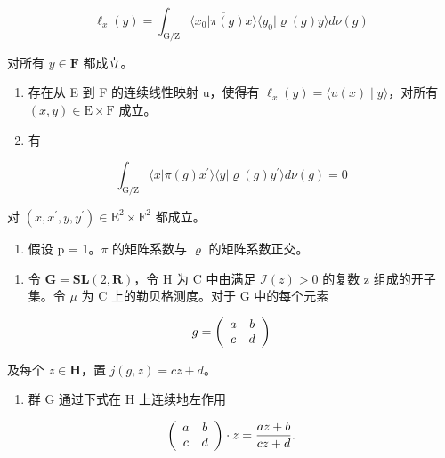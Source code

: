 \[
\ell_ {x} (y) = \int_ {\mathrm{G/Z}} \overline {{\langle x _ {0} | \pi (g) x \rangle}} \langle y _ {0} | \varrho (g) y \rangle d \nu (g)
\]

对所有 \(y \in \mathbf{F}\) 都成立。

\begin{enumerate}
\def\labelenumi{\alph{enumi})}
\setcounter{enumi}{2}
\item
  存在从 E 到 F 的连续线性映射 u，使得有 \(\ell_{x}(y)=\langle u(x)\mid y\rangle\)，对所有 \((x,y)\in\mathrm{E}\times\mathrm{F}\) 成立。
\item
  有
\end{enumerate}

\[
\int_ {\mathrm{G} / \mathrm{Z}} \overline {{\langle x | \pi (g) x ^ {\prime} \rangle}} \langle y | \varrho (g) y ^ {\prime} \rangle d \nu (g) = 0
\]

对 \((x,x^{\prime},y,y^{\prime})\in \mathrm{E}^{2}\times \mathrm{F}^{2}\) 都成立。

\begin{enumerate}
\def\labelenumi{\alph{enumi})}
\setcounter{enumi}{4}
\tightlist
\item
  假设 p = 1。\(\pi\) 的矩阵系数与 \(\varrho\) 的矩阵系数正交。
\end{enumerate}

\begin{enumerate}
\def\labelenumi{\arabic{enumi})}
\setcounter{enumi}{15}
\tightlist
\item
  令 \(\mathbf{G} = \mathbf{S}\mathbf{L}(2, \mathbf{R})\)，令 H 为 C 中由满足 \(\mathcal{I}(z) > 0\) 的复数 z 组成的开子集。令 \(\mu\) 为 C 上的勒贝格测度。对于 G 中的每个元素
\end{enumerate}

\[
g = \left( \begin{array}{c c} a & b \\ c & d \end{array} \right)
\]

及每个 \(z \in \mathbf{H}\)，置 \(j(g, z) = cz + d\)。

\begin{enumerate}
\def\labelenumi{\alph{enumi})}
\tightlist
\item
  群 G 通过下式在 H 上连续地左作用
\end{enumerate}

\[
\left( \begin{array}{c c} a & b \\ c & d \end{array} \right) \cdot z = \frac {a z + b}{c z + d}.
\]

